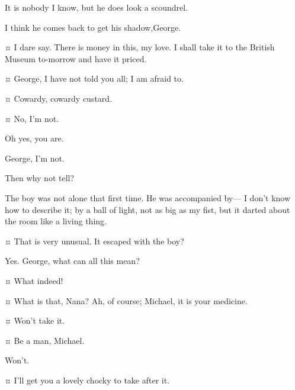 \begin{drama}
\mrdarlingspeaks
It is nobody I know, but he does look a scoundrel.

\mrsdarlingspeaks
I think he comes back to get his shadow,George.

\mrdarlingspeaks {}¤
I dare say.
There is money in this, my love.
I shall take it to the British Museum to-morrow and have it priced.


\mrsdarlingspeaks {}¤
George, I have not told you all; I am afraid to.

\mrdarlingspeaks {}¤
Cowardy, cowardy custard.

\mrsdarlingspeaks {}¤
No, I'm not.

\mrdarlingspeaks
Oh yes, you are.

\mrsdarlingspeaks
George, I'm not.

\mrdarlingspeaks
Then why not tell?

\mrsdarlingspeaks
The boy was not alone that first time.
He was accompanied by—%
I don't know how to describe it;
by a ball of light, not as big as my fist, but it darted about the room like a living thing.

\mrdarlingspeaks {}¤
That is very unusual.
It escaped with the boy?

\mrsdarlingspeaks
Yes.
George, what can all this mean?

\mrdarlingspeaks {}¤
What indeed!


\mrsdarlingspeaks {}¤
What is that, Nana?
Ah, of course; Michael, it is your medicine.

\michaelspeaks {}¤
Won't take it.

\mrdarlingspeaks {}¤
Be a man, Michael.

\michaelspeaks
Won't.

\mrsdarlingspeaks {}¤
I'll get you a lovely chocky to take after it.


\end{drama}
